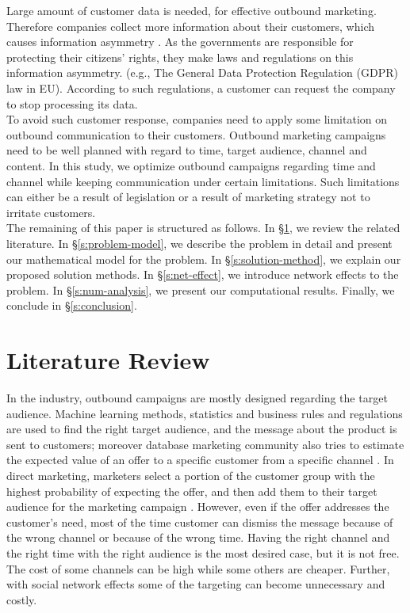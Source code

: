 \documentclass[11pt]{article}
\begin{document}
Large amount of customer data is needed, for effective outbound marketing. Therefore companies collect more information about their customers, which causes information asymmetry \citep{waerdt}. As the governments are responsible for protecting their citizens’ rights, they make laws and regulations on this information asymmetry. (e.g., The General Data Protection Regulation (GDPR) law in EU). According to such regulations, a customer can request the company to stop processing its data.\\

To avoid such customer response, companies need to apply some limitation on outbound communication to their customers. Outbound marketing campaigns need to be well planned with regard to time, target audience, channel and content. In this study, we optimize outbound campaigns regarding time and channel while keeping communication under certain limitations. Such limitations can either be a result of legislation or a result of marketing strategy not to irritate customers.\\

The remaining of this paper is structured as follows. In \S \ref{s:literature-review}, we review the related literature. In \S \ref{s:problem-model}, we describe the problem in detail and present our mathematical model for the problem. In \S \ref{s:solution-method}, we explain our proposed solution methods. In \S \ref{s:net-effect}, we introduce network effects to the problem. In \S \ref{s:num-analysis}, we present our computational results. Finally, we conclude in \S \ref{s:conclusion}.


\section{Literature Review}  \label{s:literature-review}

In the industry, outbound campaigns are mostly designed regarding the target audience. Machine learning methods, statistics and business rules and regulations are used to find the right target audience, and the message about the product is sent to customers; moreover database marketing community also tries to estimate the expected value of an offer to a specific customer from a specific channel \citep{cohen_exp, oliveira_hypr}. In direct marketing, marketers select a portion of the customer group with the highest probability of expecting the offer, and then add them to their target audience for the marketing campaign \citep{owczarczuk}. However, even if the offer addresses the customer’s need, most of the time customer can dismiss the message because of the wrong channel or because of the wrong time. Having the right channel and the right time with the right audience is the most desired case, but it is not free. The cost of some channels can be high while some others are cheaper. Further, with social network effects some of the targeting can become unnecessary and costly.\\
\end{document}
